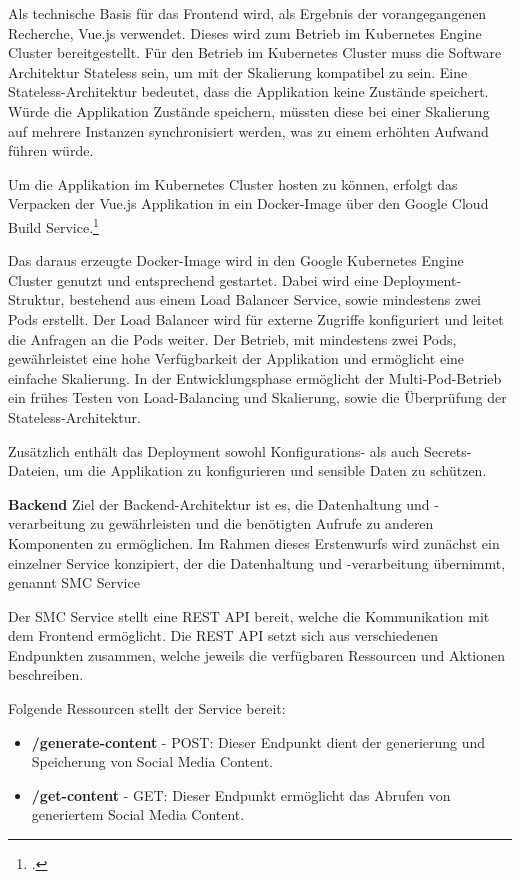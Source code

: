 Als technische Basis für das Frontend wird, als Ergebnis der vorangegangenen Recherche, Vue.js verwendet.
Dieses wird zum Betrieb im Kubernetes Engine Cluster bereitgestellt.
Für den Betrieb im Kubernetes Cluster muss die Software Architektur Stateless sein, um mit der Skalierung kompatibel zu sein.
Eine Stateless-Architektur bedeutet, dass die Applikation keine Zustände speichert.
Würde die Applikation Zustände speichern, müssten diese bei einer Skalierung auf mehrere Instanzen synchronisiert werden, was zu einem erhöhten Aufwand führen würde.

Um die Applikation im Kubernetes Cluster hosten zu können, erfolgt das Verpacken der Vue.js Applikation in ein Docker-Image über den Google Cloud Build Service.\footcite{google_cloud_build}

Das daraus erzeugte Docker-Image wird in den Google Kubernetes Engine Cluster genutzt und entsprechend gestartet.
Dabei wird eine Deployment-Struktur, bestehend aus einem Load Balancer Service, sowie mindestens zwei Pods erstellt.
Der Load Balancer wird für externe Zugriffe konfiguriert und leitet die Anfragen an die Pods weiter.
Der Betrieb, mit mindestens zwei Pods, gewährleistet eine hohe Verfügbarkeit der Applikation und ermöglicht eine einfache Skalierung.
In der Entwicklungsphase ermöglicht der Multi-Pod-Betrieb ein frühes Testen von Load-Balancing und Skalierung, sowie die Überprüfung der Stateless-Architektur.

Zusätzlich enthält das Deployment sowohl Konfigurations- als auch Secrets-Dateien, um die Applikation zu konfigurieren und sensible Daten zu schützen.

\textbf{Backend}\newline
Ziel der Backend-Architektur ist es, die Datenhaltung und -verarbeitung zu gewährleisten und die benötigten Aufrufe zu anderen Komponenten zu ermöglichen.
Im Rahmen dieses Erstenwurfs wird zunächst ein einzelner Service konzipiert, der die Datenhaltung und -verarbeitung übernimmt, genannt \ac{SMC} Service

Der \ac{SMC} Service stellt eine \ac{REST} \ac{API} bereit, welche die Kommunikation mit dem Frontend ermöglicht.
Die \ac{REST} \ac{API} setzt sich aus verschiedenen Endpunkten zusammen, welche jeweils die verfügbaren Ressourcen und Aktionen beschreiben.

Folgende Ressourcen stellt der Service bereit:
\begin{itemize}
    \item \textbf{/generate-content} - POST: Dieser Endpunkt dient der generierung und Speicherung von Social Media Content.
    \item \textbf{/get-content} - GET: Dieser Endpunkt ermöglicht das Abrufen von generiertem Social Media Content.
\end{itemize}

